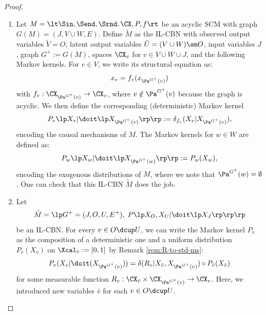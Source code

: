 \begin{proof}
  \begin{enumerate}
    \item
      Let $M = \lt \Sin, \Send, \Srnd, \CX, P, f \rt$ be an acyclic SCM with graph $G(M) = (J, V \cup W, E)$.
      Define $\tilde{M}$ as the IL-CBN with observed output variables $\tilde{V} = O$, latent output variables $\tilde{U} = (V \cup W) \sm O$, input variables $J$, graph $G^+:=G(M)$, spaces $\CX_v$ for $v \in V\cup W \cup J$, and the following Markov kernels.
      For $v \in V$, we write its structural equation as:
      $$x_v = f_v(x_{\Pa^{G^+}(v)})$$
      with $f_v : \CX_{\Pa^{G^+}(v)} \to \CX_v$,
      where $v \notin \Pa^{G^+}(v)$ because the graph is acyclic. We then define the corresponding (deterministic) Markov kernel
      \[ P_v\lp X_v|\doit\lp X_{\Pa^{G^+}(v)}\rp\rp := \delta_{f_v}(X_v|X_{\Pa^{G^+}(v)}),\]
      encoding the causal mechanisms of $M$.
      The Markov kernels for $w \in W$ are defined as:
      \[ P_w\lp X_w|\doit\lp X_{\Pa^{G^+}(w)}\rp\rp := P_w(X_w),\]
      encoding the exogenous distributions of $M$, where we note that $\Pa^{G^+}(w) = \emptyset$.
      One can check that this IL-CBN $\tilde{M}$ does the job.
    \item
      Let 
      \[ \tilde{M} = \lp G^+=(J,O,U,E^+), \; P\lp X_O,X_U| \doit\lp X_J \rp\rp \rp\]
      be an IL-CBN.
      For every $v \in O \dcup U$, we can write the Markov kernel $P_v$ as the composition of a deterministic one and 
      a uniform distribution $P_{\bar v}(X_{\bar v})$ on $\Xcal_{\bar v}:=[0,1]$ by Remark \ref{rem:R-to-std-ms}:
        \[ P_v(X_v|\doit(X_{\Pa^{G^+}(v)})) = \delta(R_v|X_{\bar v}, X_{\Pa^{G^+}(v)}) \circ P_{\bar v}(X_{\bar v}) \]
      for some measurable function $R_v : \CX_{\bar v} \times \CX_{\Pa^{G^+}(v)} \to \CX_v$.
      Here, we introduced new variables $\bar v$ for each $v \in O \dcup U$.


\end{enumerate}
\end{proof}
